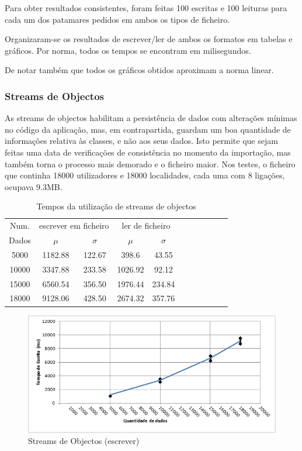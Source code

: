 \documentclass[a5paper,twocolumn, 11pt]{article}
\begin{document}
Para obter resultados consistentes, foram feitas 100 escritas e 100 leituras para cada um dos patamares pedidos em ambos os tipos de ficheiro.

Organizaram-se os resultados de escrever/ler de ambos os formatos em tabelas e gráficos. Por norma, todos os tempos se encontram em milisegundos.

De notar também que todos os gráficos obtidos aproximam a norma linear.

\clearpage
\subsubsection{Streams de Objectos}
As streams de objectos habilitam a persistência de dados com alterações mínimas no código da aplicação, mas, em contrapartida, guardam um boa quantidade de informações relativa às classes, e não aos seus dados.
Isto permite que sejam feitas uma data de verificações de consistência no momento da importação, mas também torna o processo mais demorado e o ficheiro maior. Nos testes, o ficheiro que continha 18000 utilizadores e 18000 localidades, cada uma com 8 ligações, ocupava 9.3MB.
\clearpage
\onecolumn
\begin{center}
    \begin{table}[h!b!t!]
    \begin{center}
    \caption{Tempos da utilização de streams de objectos}
    \begin{tabular}[hbt]{ | *{11}{c|} }
    \hline
        Num. & \multicolumn{2}{|c|}{escrever em ficheiro} & \multicolumn{2}{|c|}{ler de ficheiro}\\ %
        Dados & $\mu$ & $\sigma$ & $\mu$ & $\sigma$\\ \hline
        5000  & 1182.88 & 122.67 & 398.6 & 43.55\\ \hline
        10000 & 3347.88 & 233.58 & 1026.92 & 92.12\\ \hline
        15000 & 6560.54 & 356.50 & 1976.44 & 234.84\\ \hline
        18000 & 9128.06 & 428.50 & 2674.32 & 357.76\\ \hline
    \end{tabular}
\end{center}
\end{table}
\end{center}
\begin{figure}[h!b!t!]
    \caption[Streams de Objectos (escrever)]{Streams de Objectos (escrever)}
    \centering
        \includegraphics[width=400pt]{sdo_1.png}
\end{figure}
\end{document}
